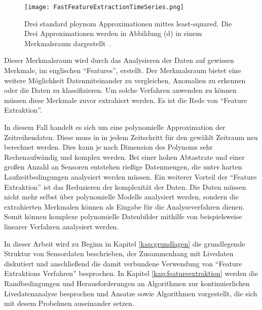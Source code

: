 \begin{figure}
  \centering
  \texttt{[image: FastFeatureExtractionTimeSeries.png]}
  \caption{Drei standard ploynom Approximationen mittes least-squared. Die Drei Approximationen werden in Abbildung (d) in einem Merkmalsraum dargestellt~\cite{gensler2015fast}.}
  \label{fig:FFETimeSeries}
\end{figure}


Dieser Merkmalsraum wird durch das Analysieren der Daten auf gewissen Merkmale, im englischen \enquote{Features}, erstellt.
Der Merkmalsraum bietet eine weitere Möglichkeit Datenmiteinander zu vergleichen, Anomalien zu erkennen oder die Daten zu klassifizieren. 
Um solche Verfahren anwenden zu können müssen diese Merkmale zuvor extrahiert werden. 
Es ist die Rede von \enquote{Feature Extraktion}.

In diesem Fall handelt es sich um eine polynomielle Approximation der Zeitreihendaten. 
Diese muss in in jedem Zeitschritt für den gewählt Zeitraum neu berechnet werden. 
Dies kann je nach Dimension des Polynoms sehr Rechenaufwändig und komplex werden.
Bei einer hohen Abtastrate und einer großen Anzahl an Sensoren entstehen rießige Datenmengen, die unter harten Laufzeitbedingungen analysiert werden müssen.
Ein weiterer Vorteil der \enquote{Feature Extraktion} ist das Reduzieren der komplexität der Daten. Die Daten müssen nicht mehr selbst über polynomielle Modelle analysiert werden, sondern die extrahierten Merkmalen können als Eingabe für die Analyseverfahren dienen. Somit können komplexe polynomielle Datenbilder mithilfe von beispielsweise linearer Verfahren analysiert werden.

In dieser Arbeit wird zu Beginn in Kapitel \ref{kap:grundlagen} die grundlegende Struktur von Sensordaten beschrieben, der Zusammenhang mit Livedaten diskutiert und anschließend die damit verbundene Verwendung von \enquote{Feature Extraktions Verfahren} besprochen. 
In Kapitel \ref{kap:featureextraktion} werden die Randbedingungen und Herausforderungen an Algorithmen zur kontinuierlichen Livedatenanalyse besprochen und Ansatze sowie Algorithmen vorgestellt, die sich mit desem Probelmen auseinander setzen.